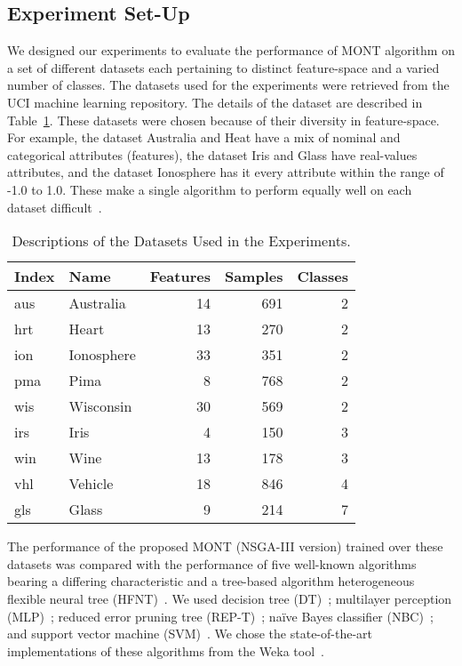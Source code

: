 \documentclass[conference]{IEEEtran}
\begin{document}
\subsection{Experiment Set-Up}
\label{sec:exp_setup}
We designed our experiments to evaluate the performance of MONT algorithm on a set of different datasets each pertaining to distinct feature-space and a varied number of classes. The datasets used for the experiments were retrieved from the UCI machine learning repository\cite{lichman2013uci}. The details of the dataset are described in Table~\ref{tab:data}. These datasets were chosen because of their diversity in feature-space. For example, the dataset Australia and Heat have a mix of nominal and categorical attributes (features), the dataset Iris and Glass have real-values attributes, and the dataset Ionosphere has it every attribute within the range of -1.0 to 1.0. These make a single algorithm to perform equally well on each dataset difficult~\cite{wolpert1996lack}.
\begin{table} [b]
    \begin{center}   
        \renewcommand{\arraystretch}{1.2}
{\caption{Descriptions of the Datasets Used in the Experiments.}
            \label{tab:data}}
        \begin{tabular}{llrrr}
            \hline
            Index & Name & Features & Samples & Classes\\
            \hline
            aus & Australia  & 14 &  691 & 2 \\
            hrt & Heart      & 13 &  270 & 2 \\
            ion & Ionosphere  & 33 &  351 & 2 \\
            pma & Pima       &  8 &  768 & 2 \\
            wis & Wisconsin  & 30 &  569 & 2 \\
            irs & Iris       &  4 &  150 & 3 \\
            win & Wine       & 13 &  178 & 3 \\
            vhl & Vehicle    & 18 &  846 & 4 \\
            gls & Glass      &  9 &  214 & 7 \\
            \hline
        \end{tabular}
    \end{center}
\end{table}

The performance of the proposed MONT (NSGA-III version) trained over these datasets was compared with the performance of five well-known algorithms bearing a differing characteristic and a tree-based algorithm heterogeneous flexible neural tree (HFNT)~\cite{ojha2017ensemble}. We used decision tree (DT)~\cite{quinlan2014c4}; multilayer perception (MLP)~\cite{annBpRumelhart1986}; reduced error pruning tree (REP-T)~\cite{kohavi2002data}; na\"{i}ve Bayes classifier (NBC)~\cite{john1995estimating}; and support vector machine (SVM)~\cite{chang2011libsvm}. We chose the state-of-the-art implementations of these algorithms from the Weka tool~\cite{hall2009weka}. 
\end{document}
